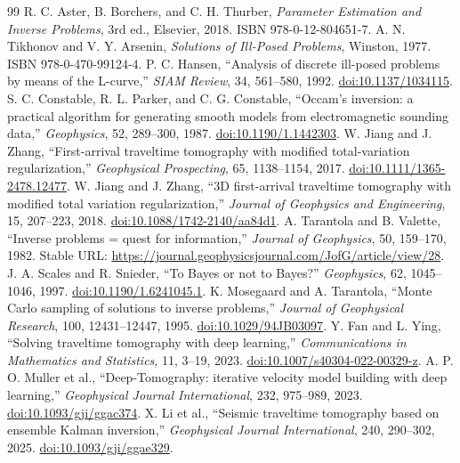 \documentclass[11pt]{article}
\begin{document}
\begin{thebibliography}{99}
 R. C. Aster, B. Borchers, and C. H. Thurber, \emph{Parameter Estimation and Inverse Problems}, 3rd ed., Elsevier, 2018. ISBN 978-0-12-804651-7.
 A. N. Tikhonov and V. Y. Arsenin, \emph{Solutions of Ill-Posed Problems}, Winston, 1977. ISBN 978-0-470-99124-4.
 P. C. Hansen, ``Analysis of discrete ill-posed problems by means of the L-curve,'' \emph{SIAM Review}, 34, 561--580, 1992. \href{https://doi.org/10.1137/1034115}{doi:10.1137/1034115}.
 S. C. Constable, R. L. Parker, and C. G. Constable, ``Occam's inversion: a practical algorithm for generating smooth models from electromagnetic sounding data,'' \emph{Geophysics}, 52, 289--300, 1987. \href{https://doi.org/10.1190/1.1442303}{doi:10.1190/1.1442303}.
 W. Jiang and J. Zhang, ``First-arrival traveltime tomography with modified total-variation regularization,'' \emph{Geophysical Prospecting}, 65, 1138--1154, 2017. \href{https://doi.org/10.1111/1365-2478.12477}{doi:10.1111/1365-2478.12477}.
 W. Jiang and J. Zhang, ``3D first-arrival traveltime tomography with modified total variation regularization,'' \emph{Journal of Geophysics and Engineering}, 15, 207--223, 2018. \href{https://doi.org/10.1088/1742-2140/aa84d1}{doi:10.1088/1742-2140/aa84d1}.
 A. Tarantola and B. Valette, ``Inverse problems = quest for information,'' \emph{Journal of Geophysics}, 50, 159--170, 1982. Stable URL: \url{https://journal.geophysicsjournal.com/JofG/article/view/28}.
 J. A. Scales and R. Snieder, ``To Bayes or not to Bayes?'' \emph{Geophysics}, 62, 1045--1046, 1997. \href{https://doi.org/10.1190/1.6241045.1}{doi:10.1190/1.6241045.1}.
 K. Mosegaard and A. Tarantola, ``Monte Carlo sampling of solutions to inverse problems,'' \emph{Journal of Geophysical Research}, 100, 12431--12447, 1995. \href{https://doi.org/10.1029/94JB03097}{doi:10.1029/94JB03097}.
 Y. Fan and L. Ying, ``Solving traveltime tomography with deep learning,'' \emph{Communications in Mathematics and Statistics}, 11, 3--19, 2023. \href{https://doi.org/10.1007/s40304-022-00329-z}{doi:10.1007/s40304-022-00329-z}.
 A. P. O. Muller et al., ``Deep-Tomography: iterative velocity model building with deep learning,'' \emph{Geophysical Journal International}, 232, 975--989, 2023. \href{https://doi.org/10.1093/gji/ggac374}{doi:10.1093/gji/ggac374}.
 X. Li et al., ``Seismic traveltime tomography based on ensemble Kalman inversion,'' \emph{Geophysical Journal International}, 240, 290--302, 2025. \href{https://doi.org/10.1093/gji/ggae329}{doi:10.1093/gji/ggae329}.

\end{thebibliography}
\end{document}
